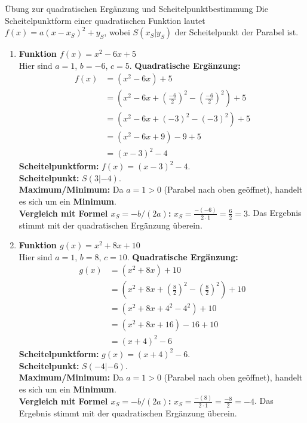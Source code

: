 \begin{loesungsumgebung}{Übung zur quadratischen Ergänzung und Scheitelpunktbestimmung}
Die Scheitelpunktform einer quadratischen Funktion lautet $f(x) = a(x-x_S)^2 + y_S$, wobei $S(x_S|y_S)$ der Scheitelpunkt der Parabel ist.

\begin{enumerate}[label=(\alph*)]
    \item \textbf{Funktion $f(x) = x^2 - 6x + 5$} \\
    Hier sind $a=1$, $b=-6$, $c=5$.
    \textbf{Quadratische Ergänzung:}
    \begin{align*}
    f(x) &= (x^2 - 6x) + 5 \\
         &= \left(x^2 - 6x + \left(\frac{-6}{2}\right)^2 - \left(\frac{-6}{2}\right)^2\right) + 5 \\
         &= (x^2 - 6x + (-3)^2 - (-3)^2) + 5 \\
         &= (x^2 - 6x + 9) - 9 + 5 \\
         &= (x - 3)^2 - 4
    \end{align*}
    \textbf{Scheitelpunktform:} $f(x) = (x - 3)^2 - 4$. \\
    \textbf{Scheitelpunkt:} $S(3|-4)$. \\
    \textbf{Maximum/Minimum:} Da $a=1 > 0$ (Parabel nach oben geöffnet), handelt es sich um ein \textbf{Minimum}. \\
    \textbf{Vergleich mit Formel $x_S = -b/(2a)$:}
    $x_S = \frac{-(-6)}{2 \cdot 1} = \frac{6}{2} = 3$. Das Ergebnis stimmt mit der quadratischen Ergänzung überein.

    \item \textbf{Funktion $g(x) = x^2 + 8x + 10$} \\
    Hier sind $a=1$, $b=8$, $c=10$.
    \textbf{Quadratische Ergänzung:}
    \begin{align*}
    g(x) &= (x^2 + 8x) + 10 \\
         &= \left(x^2 + 8x + \left(\frac{8}{2}\right)^2 - \left(\frac{8}{2}\right)^2\right) + 10 \\
         &= (x^2 + 8x + 4^2 - 4^2) + 10 \\
         &= (x^2 + 8x + 16) - 16 + 10 \\
         &= (x + 4)^2 - 6
    \end{align*}
    \textbf{Scheitelpunktform:} $g(x) = (x + 4)^2 - 6$. \\
    \textbf{Scheitelpunkt:} $S(-4|-6)$. \\
    \textbf{Maximum/Minimum:} Da $a=1 > 0$ (Parabel nach oben geöffnet), handelt es sich um ein \textbf{Minimum}. \\
    \textbf{Vergleich mit Formel $x_S = -b/(2a)$:}
    $x_S = \frac{-(8)}{2 \cdot 1} = \frac{-8}{2} = -4$. Das Ergebnis stimmt mit der quadratischen Ergänzung überein.


\end{enumerate}
\end{loesungsumgebung}
